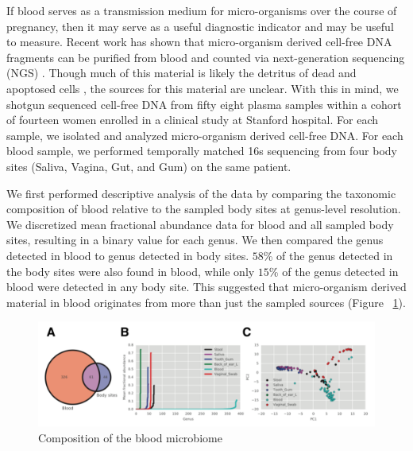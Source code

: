 If blood serves as a transmission medium for micro-organisms over the course of pregnancy, then it may serve as a useful diagnostic indicator and may be useful to measure. Recent work has shown that micro-organism derived cell-free DNA fragments can be purified from blood and counted via next-generation sequencing (NGS) \cite{DeVlaminck:2013hl}. Though much of this material is likely the detritus of dead and apoptosed cells \cite{Quake:2012iy}, the sources for this material are unclear. With this in mind, we shotgun sequenced cell-free DNA from fifty eight plasma samples within a cohort of fourteen women enrolled in a clinical study at Stanford hospital. For each sample, we isolated and analyzed micro-organism derived cell-free DNA. For each blood sample, we performed temporally matched 16s sequencing from four body sites (Saliva, Vagina, Gut, and Gum) on the same patient.

We first performed descriptive analysis of the data by comparing the taxonomic composition of blood relative to the sampled body sites at genus-level resolution. We discretized mean fractional abundance data for blood and all sampled body sites, resulting in a binary value for each genus. We then compared the genus detected in blood to genus detected in body sites. $58$\% of the genus detected in the body sites were also found in blood, while only $15$\% of the genus detected in blood were detected in any body site. This suggested that micro-organism derived material in blood originates from more than just the sampled sources (Figure ~\ref{fig:Fig12}).

\begin{figure}
\center\includegraphics[width=150mm,scale=0.5]{Figures/Fig12}
\caption{Composition of the blood microbiome}
\label{fig:Fig12}
\end{figure}

